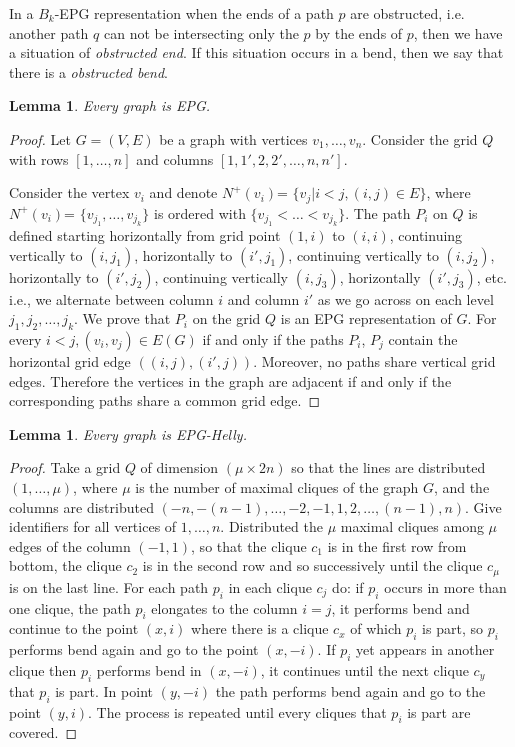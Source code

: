 \documentclass[a4paper,11pt]{article}
\newtheorem{lema}[theorem]{Lemma}
\begin{document}
In a $B_k$-EPG representation when the ends of a path $p$ are obstructed, i.e. another path $q$ can not be intersecting only the $p$ by the ends of $p$, then we have a situation of \emph{obstructed end}. If this situation occurs in a bend, then we say that there is a \emph{obstructed bend}.
 
 \begin{lema} \citep{golumbic2009} \label{lem:todoGrafoEpg}
 Every graph is EPG.
 \end{lema}
 \begin{proof}
 Let $G=(V,E)$ be a graph with vertices $v_1,\dots ,v_n$. Consider the grid $Q$ with rows $[1,\dots ,n]$ and columns $[1, 1', 2, 2', \dots, n,n']$. 
 
 Consider the vertex $v_i$ and denote $N^+(v_i)$= $\{v_j|i<j,(i,j)\in E\}$, where $N^+(v_i)$= $\{v_{j_1}, \dots, v_{j_k}\}$ is ordered with $\{v_{j_1}< \dots < v_{j_k}\}$.   The path $P_i$ on $Q$ is defined starting horizontally from grid point $(1,i)$ to $(i,i)$, continuing vertically to $(i,j_1)$, horizontally to $(i',j_1)$, continuing vertically to $(i,j_2)$, horizontally to $(i',j_2)$, continuing vertically $(i,j_3)$, horizontally $(i',j_3)$, etc. i.e., we alternate between column $i$ and column $i'$ as we go across on each level $j_1, j_2, \dots, j_k$. %
 We prove that $P_i$ on the grid $Q$ is an EPG representation of $G$. For every $i<j,(v_i,v_j)\in E(G)$ if and only if the paths $P_i$, $P_j$ contain the horizontal grid edge $((i,j), (i',j))$. Moreover, no paths share vertical grid edges. Therefore the vertices in the graph are adjacent if and only if the corresponding paths share a common grid edge.
 \end{proof}
 
 \begin{lema}\label{lem:todoGrafoEpgHelly}
 Every graph is EPG-Helly.
 \end{lema}
  \begin{proof}
 Take a grid $Q$ of dimension $(\mu \times 2n)$ so that the lines are distributed $(1, \dots, \mu)$, where $\mu$ is the number of maximal cliques of the graph $G$, and the columns are distributed $(-n, -(n-1), \dots, -2, -1, 1, 2, \dots, (n-1), n)$. Give identifiers for all vertices of $1, \dots, n$.  Distributed the $\mu$ maximal cliques among $\mu$ edges of the column $(-1, 1)$, so that the clique $c_1$ is in the first row from bottom, the clique $c_2$ is in the second row  and so successively until the clique $c_\mu$ is on the last line. For each path $p_i$ in each clique $c_j$ do: if $p_i$ occurs in more than one clique, the path $p_i$ elongates to the column $i=j$, it performs bend and continue to the point $(x,i)$ where there is a clique $c_x$  of which $p_i$ is part, so $p_i$ performs bend again and go to the point $(x,-i)$. If $p_i$ yet appears in another clique then $p_i$ performs bend in $(x,-i)$, it continues until the next clique $c_y$ that $p_i$ is part. In point $(y,-i)$ the path performs bend again and go to the point $(y,i)$. The process is  repeated until every cliques that $p_i$ is part are covered. 
 \end{proof}
 
\end{document}
